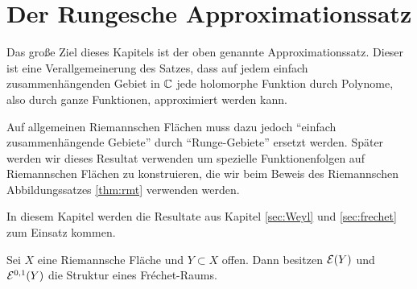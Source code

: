 
\section{Der Rungesche Approximationssatz}
\label{sec:Runge}

Das große Ziel dieses Kapitels ist der oben genannte
Approximationssatz. Dieser ist eine Verallgemeinerung des Satzes, dass
auf jedem einfach zusammenhängenden Gebiet in $\mathbb{C}$ jede holomorphe
Funktion durch Polynome, also durch ganze Funktionen, approximiert
werden kann.

Auf allgemeinen Riemannschen Flächen muss dazu jedoch "`einfach
zusammenhängende Gebiete"' durch "`Runge-Gebiete"' ersetzt
werden. Später werden wir dieses Resultat verwenden um spezielle
Funktionenfolgen auf Riemannschen Flächen zu konstruieren, die wir
beim Beweis des Riemannschen Abbildungssatzes \ref{thm:rmt} verwenden
werden.

In diesem Kapitel werden die Resultate aus Kapitel
\ref{sec:Weyl} und \ref{sec:frechet} zum Einsatz kommen.

\begin{prop}
  \label{prop:diff-frechet}
  Sei $X$ eine Riemannsche Fläche und $Y \subset X$ offen. 
  Dann besitzen $\mathcal{E}(Y)$ und $\mathcal{E}^{0,1}(Y)$ die Struktur eines Fr\'echet-Raums.
\end{prop}

